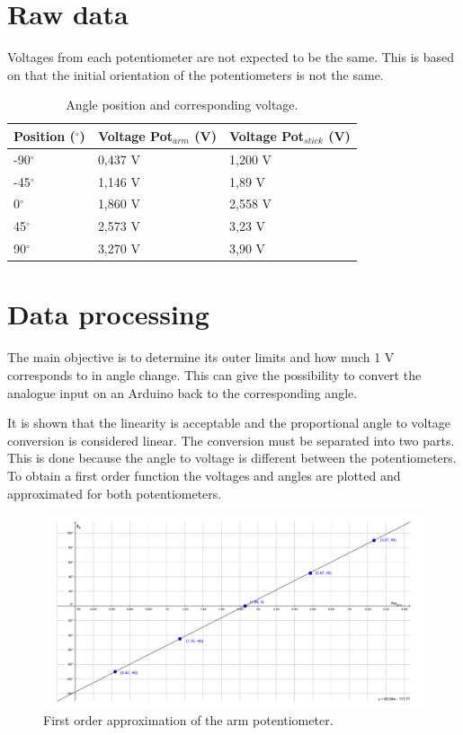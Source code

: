 \section*{Raw data}
Voltages from each potentiometer are not expected to be the same. This is based on that the initial orientation of the potentiometers is not the same. 
\begin{table}[htbp]
\centering
\begin{tabular}{lll}
\hline
Position ($^\circ$) & Voltage Pot$_{arm}$ (V) & Voltage Pot$_{stick}$ (V) \\ \hline
-90$^\circ$         & 0,437 V                 & 1,200 V                   \\
-45$^\circ$         & 1,146 V                 & 1,89 V                   \\
0$^\circ$           & 1,860 V                 & 2,558 V                   \\
45$^\circ$          & 2,573 V                 & 3,23 V                   \\
90$^\circ$          & 3,270 V                 & 3,90 V                   
\end{tabular}
\caption{Angle position and corresponding voltage.}
\label{AngleTable}
\end{table}
\section*{Data processing}
The main objective is to determine its outer limits and how much 1 V corresponds to in angle change. This can give the possibility to convert the analogue input on an Arduino back to the corresponding angle. 


It is shown that the linearity is acceptable and the proportional angle to voltage conversion is considered linear.
The conversion must be separated into two parts. This is done because the angle to voltage is different between the potentiometers.
To obtain a first order function the voltages and angles are plotted and approximated for both potentiometers.

\begin{figure}[htbp]
\hspace*{-3cm}  
\centering
\includegraphics[width=0.9\paperwidth]{figures/appendix/PotentiometerPlot.pdf}
\caption{First order approximation of the arm potentiometer.}
\label{fig:PotentiometerPlot}
\end{figure}
\bigbreak

